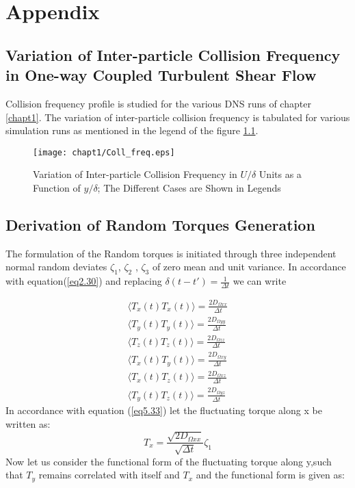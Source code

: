 \chapter{Appendix}
\section{Variation of Inter-particle Collision Frequency in One-way Coupled Turbulent Shear Flow }
\label{app_coll_freq}
	Collision frequency profile is studied for the various DNS runs of chapter \ref{chapt1}. The variation of inter-particle collision frequency is tabulated for various simulation runs as mentioned in the legend of the figure \ref{fig:coll_freq}.
	\begin{figure}[h]
	    \centering
	    \texttt{[image: chapt1/Coll\_freq.eps]}
	    \caption{Variation of Inter-particle Collision Frequency in $U/\delta$ Units as a Function of $y/\delta$; The Different Cases are Shown in Legends }
	    \label{fig:coll_freq}
	\end{figure}
	\clearpage
\clearpage	
\section{Derivation of Random Torques Generation}
\label{Derivation of Random Torque Generation}
The formulation of the Random torques is initiated through three independent normal random deviates $\zeta_1$, $\zeta_2$ , $\zeta_3$  of zero mean and unit variance. 
In accordance with equation(\ref{eq2.30}) and replacing $\delta(t-t')=\frac{1}{\Delta t}$ we can write

\begin{eqnarray}
	\label{eq5.33}
	\langle T_x(t)T_x(t)\rangle=\frac{2D_{\Omega{xx}}}{\Delta t}\\
	\label{eq5.34}
	\langle T_y(t)T_y(t)\rangle=\frac{2D_{\Omega{yy}}}{\Delta t}\\
	\label{eq5.35}
	\langle T_z(t)T_z(t)\rangle=\frac{2D_{\Omega{zz}}}{\Delta t}\\
	\label{eq5.36}
	\langle T_x(t)T_y(t)\rangle=\frac{2D_{\Omega{xy}}}{\Delta t}\\
	\label{eq5.37}
	\langle T_x(t)T_z(t)\rangle=\frac{2D_{\Omega{xz}}}{\Delta t}\\
	\label{eq5.38}
	\langle T_y(t)T_z(t)\rangle=\frac{2D_{\Omega{yz}}}{\Delta t}
\end{eqnarray}
In accordance with equation (\ref{eq5.33}) let the fluctuating torque along x be written as:
\begin{equation}
	\label{eq5.39}
	T_x=\frac{\sqrt{2D_{\Omega{xx}}}}{\sqrt{\Delta t}}\zeta_1
\end{equation} 
Now let us consider the functional form of the fluctuating torque along y,such that $T_y$ remains correlated with itself and $T_x$ and the functional form is given as:

